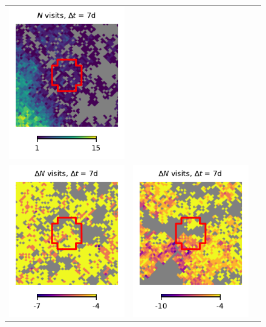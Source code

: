 \documentclass[preprintm,linenumbers]{aastex631}
\begin{document}
\begin{figure}
\begin{tabular}{c c c}
				\includegraphics{results/skymaps_cutout/skymaps_cutout_first_year_one_snap_v4_0_10yrs_db_noDD_noTwi_tscale-7_nside-256_doAllTemplateMetrics_reduceCount_g_GP_noDD_noTwi.pdf} \\
				\includegraphics{results/skymaps_cutout/skymaps_cutout_delta_first_year_one_snap_v4_0_10yrs_db_noDD_noTwi_tscale-7_nside-256_doAllTemplateMetrics_reduceCount_g_NES_noDD_noTwi.pdf} &
				\includegraphics{results/skymaps_cutout/skymaps_cutout_delta_first_year_one_snap_v4_0_10yrs_db_noDD_noTwi_tscale-7_nside-256_doAllTemplateMetrics_reduceCount_g_WFD_noDD_noTwi.pdf} &

\end{tabular}
\end{figure}
\end{document}

